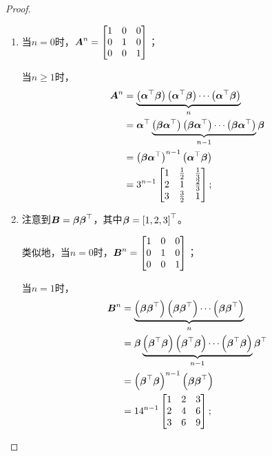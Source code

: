 \begin{proof}
    \begin{enumerate}
        \item 当\(n=0\)时，\(\boldsymbol{A}^n=\begin{bmatrix}1&0&0\\0&1&0\\0&0&1\end{bmatrix}\)；

              当\(n\ge1\)时，
              \begin{align*}
                  \boldsymbol{A}^n & =\underbrace{\left( \boldsymbol{\alpha}^\top\boldsymbol{\beta} \right)\left( \boldsymbol{\alpha}^\top\boldsymbol{\beta} \right)\cdots\left( \boldsymbol{\alpha}^\top\boldsymbol{\beta} \right)}_n                        \\
                          & =\boldsymbol{\alpha}^\top\underbrace{\left( \boldsymbol{\beta}\boldsymbol{\alpha}^\top \right)\left( \boldsymbol{\beta}\boldsymbol{\alpha}^\top \right)\cdots\left( \boldsymbol{\beta}\boldsymbol{\alpha}^\top \right)}_{n-1}\boldsymbol{\beta} \\
                          & =\left( \boldsymbol{\beta}\boldsymbol{\alpha}^\top \right)^{n-1}\left( \boldsymbol{\alpha}^\top\boldsymbol{\beta} \right)                                                                 \\
                          & =3^{n-1}\begin{bmatrix}
                                        1 & \frac{1}{2} & \frac{1}{3} \\
                                        2 & 1           & \frac{2}{3} \\
                                        3 & \frac{3}{2} & 1
                                    \end{bmatrix};
              \end{align*}
        \item 注意到\(\boldsymbol{B}=\boldsymbol{\beta}\boldsymbol{\beta}^\top\)，其中\(\boldsymbol{\beta}=\left[ 1,2,3 \right]^\top\)。

              类似地，当\(n=0\)时，\(\boldsymbol{B}^n=\begin{bmatrix}1&0&0\\0&1&0\\0&0&1\end{bmatrix}\)；

              当\(n=1\)时，
              \begin{align*}
                  \boldsymbol{B}^n & =\underbrace{\left( \boldsymbol{\beta}\boldsymbol{\beta}^\top \right)\left( \boldsymbol{\beta}\boldsymbol{\beta}^\top \right)\cdots\left( \boldsymbol{\beta}\boldsymbol{\beta}^\top \right)}_n                          \\
                          & =\boldsymbol{\beta}\underbrace{\left( \boldsymbol{\beta}^\top\boldsymbol{\beta} \right)\left( \boldsymbol{\beta}^\top\boldsymbol{\beta} \right)\cdots\left( \boldsymbol{\beta}^\top\boldsymbol{\beta} \right)}_{n-1}\boldsymbol{\beta}^\top \\
                          & =\left( \boldsymbol{\beta}^\top\boldsymbol{\beta} \right)^{n-1}\left( \boldsymbol{\beta}\boldsymbol{\beta}^\top \right)                                                                     \\
                          & ={14}^{n-1}
                  \begin{bmatrix}
                      1 & 2 & 3 \\
                      2 & 4 & 6 \\
                      3 & 6 & 9
                  \end{bmatrix};
              \end{align*}


\end{enumerate}
\end{proof}
